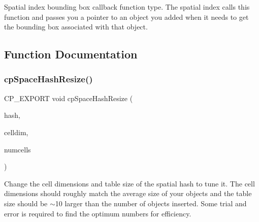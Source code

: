 Spatial index bounding box callback function type. The spatial index calls this function and passes you a pointer to an object you added when it needs to get the bounding box associated with that object. 

\subsection{Function Documentation}
\mbox{\label{group__cpSpatialIndex_gac6ac718f3e9509abc2c01d256d4217a5}} 
\subsubsection{\texorpdfstring{cp\+Space\+Hash\+Resize()}{cpSpaceHashResize()}}
{\footnotesize\ttfamily C\+P\+\_\+\+E\+X\+P\+O\+RT void cp\+Space\+Hash\+Resize (\begin{DoxyParamCaption}\item[{cp\+Space\+Hash $\ast$}]{hash,  }\item[{cp\+Float}]{celldim,  }\item[{int}]{numcells }\end{DoxyParamCaption})}

Change the cell dimensions and table size of the spatial hash to tune it. The cell dimensions should roughly match the average size of your objects and the table size should be $\sim$10 larger than the number of objects inserted. Some trial and error is required to find the optimum numbers for efficiency. 